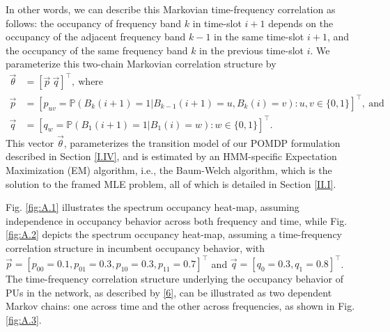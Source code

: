 In other words, we can describe this Markovian time-frequency correlation as follows: the occupancy of frequency band $k$ in time-slot $i+1$ depends on the occupancy of the adjacent frequency band $k-1$ in the same time-slot $i+1$, and the occupancy of the same frequency band $k$ in the previous time-slot $i$. We parameterize this two-chain Markovian correlation structure by
\begin{equation}\label{7}
    \begin{aligned}
        \vec{\theta}&=[\vec{p}\ \vec{q}]^{\intercal},\ \text{where}\\
        \vec{p}&=[p_{uv}=\mathbb{P}(B_{k}(i+1)=1|B_{k-1}(i+1)=u,B_{k}(i)=v):u,v \in \{0,1\}]^{\intercal},\ \text{and}\\
        \vec{q}&=[q_{w}=\mathbb{P}(B_{1}(i+1)=1|B_{1}(i)=w):w \in \{0,1\}]^{\intercal}.
    \end{aligned}
\end{equation}
This vector $\vec{\theta}$, parameterizes the transition model of our POMDP formulation described in Section \ref{I.IV}, and is estimated by an HMM-specific Expectation Maximization (EM) algorithm, i.e., the Baum-Welch algorithm, which is the solution to the framed MLE problem, all of which is detailed in Section \ref{II.I}.

Fig. \ref{fig:A.1} illustrates the spectrum occupancy heat-map, assuming independence in occupancy behavior across both frequency and time, while Fig. \ref{fig:A.2} depicts the spectrum occupancy heat-map, assuming a time-frequency correlation structure in incumbent occupancy behavior, with $\vec{p}{=}[p_{00}{=}0.1,p_{01}{=}0.3,p_{10}{=}0.3,p_{11}{=}0.7]^{\intercal}$ and $\vec{q}=[q_{0}{=}0.3,q_{1}{=}0.8]^{\intercal}$. The time-frequency correlation structure underlying the occupancy behavior of PUs in the network, as described by \eqref{6}, can be illustrated as two dependent Markov chains: one across time and the other across frequencies, as shown in Fig. \ref{fig:A.3}.
